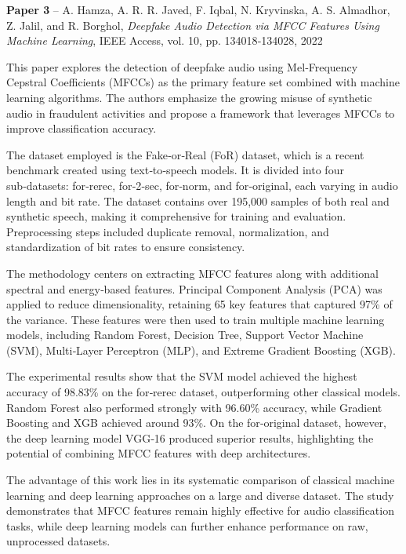 \documentclass[12pt,a4paper]{report}
\begin{document}

\textbf{Paper 3} – A. Hamza, A. R. R. Javed, F. Iqbal, N. Kryvinska, A. S. Almadhor, Z. Jalil, and R. Borghol, \textit{Deepfake Audio Detection via MFCC Features Using Machine Learning}, IEEE Access, vol. 10, pp. 134018‑134028, 2022

This paper explores the detection of deepfake audio using Mel‑Frequency Cepstral Coefficients (MFCCs) as the primary feature set combined with machine learning algorithms. The authors emphasize the growing misuse of synthetic audio in fraudulent activities and propose a framework that leverages MFCCs to improve classification accuracy.

The dataset employed is the Fake‑or‑Real (FoR) dataset, which is a recent benchmark created using text‑to‑speech models. It is divided into four sub‑datasets: for‑rerec, for‑2‑sec, for‑norm, and for‑original, each varying in audio length and bit rate. The dataset contains over 195,000 samples of both real and synthetic speech, making it comprehensive for training and evaluation. Preprocessing steps included duplicate removal, normalization, and standardization of bit rates to ensure consistency.

The methodology centers on extracting MFCC features along with additional spectral and energy‑based features. Principal Component Analysis (PCA) was applied to reduce dimensionality, retaining 65 key features that captured 97\% of the variance. These features were then used to train multiple machine learning models, including Random Forest, Decision Tree, Support Vector Machine (SVM), Multi‑Layer Perceptron (MLP), and Extreme Gradient Boosting (XGB).

The experimental results show that the SVM model achieved the highest accuracy of 98.83\% on the for‑rerec dataset, outperforming other classical models. Random Forest also performed strongly with 96.60\% accuracy, while Gradient Boosting and XGB achieved around 93\%. On the for‑original dataset, however, the deep learning model VGG‑16 produced superior results, highlighting the potential of combining MFCC features with deep architectures.

The advantage of this work lies in its systematic comparison of classical machine learning and deep learning approaches on a large and diverse dataset. The study demonstrates that MFCC features remain highly effective for audio classification tasks, while deep learning models can further enhance performance on raw, unprocessed datasets.
\end{document}
